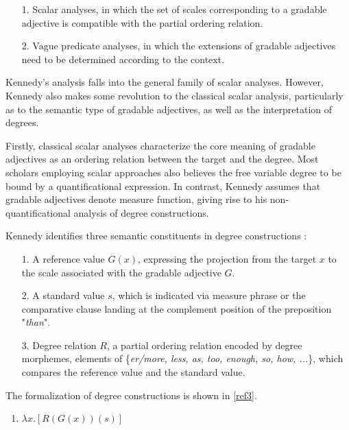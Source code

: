 \documentclass{ctexart}
\let \cite \parencite
\begin{document}
\begin{itemize}
    \item[1.] Scalar analyses, in which the set of scales corresponding to a gradable adjective is compatible with the partial ordering relation\cite{cresswell1976,bierwisch1989}.
    \item[2.] Vague predicate analyses, in which the extensions of gradable adjectives need to be determined according to the context\cite{ginet1973,kamp2013,klein1980}. 
\end{itemize}

Kennedy’s analysis falls into the general family of scalar analyses. However, Kennedy also makes some revolution to the classical scalar analysis, particularly as to the semantic type of gradable adjectives, as well as the interpretation of degrees.

Firstly, classical scalar analyses characterize the core meaning of gradable adjectives as an ordering relation between the target and the degree. Most scholars employing scalar approaches also believes the free variable degree to be bound by a quantificational expression\cite{hellan1981,hoeksema1983,von1984a}. In contrast, Kennedy assumes that gradable adjectives denote measure function, giving rise to his non-quantificational analysis of degree constructions.

Kennedy identifies three semantic constituents in degree constructions \cite{russell1905}: 

\begin{itemize}
    \item[1.] A reference value $G(x)$, expressing the projection from the target $x$ to the scale associated with the gradable adjective $G$.
    \item[2.] A standard value $s$, which is indicated via measure phrase or the comparative clause landing at the complement position of the preposition "\textit{than}". 
    \item[3.] Degree relation $R$, a partial ordering relation encoded by degree morphemes, elements of \{\textit{er/more, less, as, too, enough, so, how, ...}\}, which compares the reference value and the standard value. 
\end{itemize}

The formalization of degree constructions is shown in \ref{ref3}.

\begin{enumerate}[resume]
\item \label{ref3} $\lambda x.[R(G(x))(s)]$
\end{enumerate}
\end{document}
